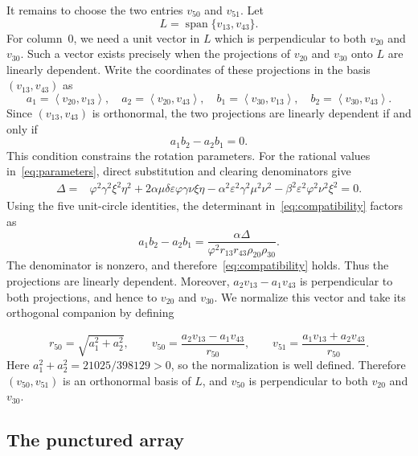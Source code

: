 \documentclass[11pt]{article}
\theoremstyle{definition}
\newcommand{\spn}{\operatorname{span}}
\newcommand{\ip}[2]{\left\langle #1,#2\right\rangle}
\begin{document}
It remains to choose the two entries $v_{50}$ and $v_{51}$.  Let
\[
L=\spn\{v_{13},v_{43}\}.
\]
For column~$0$, we need a unit vector in $L$ which is perpendicular to both
$v_{20}$ and $v_{30}$.  Such a vector exists precisely when the projections
of $v_{20}$ and $v_{30}$ onto $L$ are linearly dependent.  Write the
coordinates of these projections in the basis $(v_{13},v_{43})$ as
\begin{equation}\label{eq:aabb}
a_1=\ip{v_{20}}{v_{13}},\quad
a_2=\ip{v_{20}}{v_{43}},\quad
b_1=\ip{v_{30}}{v_{13}},\quad
b_2=\ip{v_{30}}{v_{43}}.
\end{equation}
Since $(v_{13},v_{43})$ is orthonormal, the two projections are linearly
dependent if and only if
\begin{equation}\label{eq:compatibility}
a_1b_2-a_2b_1=0.
\end{equation}
This condition constrains the rotation parameters.  For the rational values
in~\eqref{eq:parameters}, direct substitution and clearing denominators give
\begin{align}
\Delta={}&\varphi^2\gamma^2\xi^2\eta^2
+2\alpha\mu\delta\varepsilon\varphi\gamma\nu\xi\eta
-\alpha^2\varepsilon^2\gamma^2\mu^2\nu^2
-\beta^2\varepsilon^2\varphi^2\nu^2\xi^2=0.\label{eq:Delta}
\end{align}
Using the five unit-circle identities, the determinant
in~\eqref{eq:compatibility} factors as
\begin{equation}\label{eq:compatibility-factor}
a_1b_2-a_2b_1
=\frac{\alpha\Delta}
{\varphi^2r_{13}r_{43}\rho_{20}\rho_{30}}.
\end{equation}
The denominator is nonzero, and therefore~\eqref{eq:compatibility} holds.
Thus the projections are linearly dependent.  Moreover,
$a_2v_{13}-a_1v_{43}$ is perpendicular to both projections, and hence to
$v_{20}$ and $v_{30}$.  We normalize this vector and take its orthogonal
companion by defining

\begin{equation}\label{eq:v5051}
r_{50}=\sqrt{a_1^2+a_2^2},\qquad
v_{50}=\frac{a_2v_{13}-a_1v_{43}}{r_{50}},\qquad
v_{51}=\frac{a_1v_{13}+a_2v_{43}}{r_{50}}.
\end{equation}
Here $a_1^2+a_2^2=21025/398129>0$, so the normalization is well defined.
Therefore $(v_{50},v_{51})$ is an orthonormal basis of $L$, and $v_{50}$ is
perpendicular to both $v_{20}$ and $v_{30}$.

\subsection{The punctured array}
\end{document}
